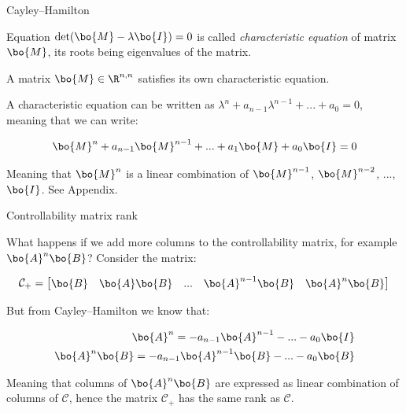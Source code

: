 \documentclass{beamer}
\begin{document}
\begin{frame}{Cayley–Hamilton}
	\begin{flushleft}
		
		Equation $\text{det}(\bo{M} - \lambda\bo{I}) = 0$ is called \emph{characteristic equation} of matrix $\bo{M}$, its roots being eigenvalues of the matrix.
		
		\bigskip
		
		\begin{theorem}
			A matrix $\bo{M} \in \R^{n, n}$ satisfies its own characteristic equation.
		\end{theorem}
		
		A characteristic equation can be written as $\lambda^n + a_{n-1}\lambda^{n-1} + ... + a_0  = 0$, meaning that we can write:
		
		\begin{equation}
			\bo{M}^n + a_{n-1}\bo{M}^{n-1} + ... + a_1\bo{M} + a_0\bo{I}  = 0
		\end{equation}	
		
		Meaning that \textcolor{mydarkblue}{$\bo{M}^n$ is a linear combination of $\bo{M}^{n-1}$, $\bo{M}^{n-2}$, ..., $\bo{I}$}. See Appendix.
		
	\end{flushleft}
\end{frame}



\begin{frame}{Controllability matrix rank}
	\begin{flushleft}
		
		What happens if we add more columns to the controllability matrix, for example $\bo{A}^n \bo{B}$? Consider the matrix:
		
		\begin{equation}
			\mathcal{C}_+ = \begin{bmatrix}
				\bo{B} &
				\bo{A} \bo{B} & ... &
				\bo{A}^{n - 1} \bo{B} &
				\bo{A}^n \bo{B}
			\end{bmatrix}
		\end{equation}
		
		But from Cayley–Hamilton we know that: 
		
		\begin{align}
			\bo{A}^n = -a_{n-1}\bo{A}^{n-1} - ... - a_0\bo{I} 
			\\
			\bo{A}^n\bo{B} = -a_{n-1}\bo{A}^{n-1}\bo{B} - ... - a_0\bo{B}
		\end{align}
		
		Meaning that columns of $\bo{A}^n\bo{B}$ are expressed as linear combination of columns of $\mathcal{C}$, hence the matrix $\mathcal{C}_+$ has the same rank as $\mathcal{C}$.
		
	\end{flushleft}
\end{frame}
\end{document}
